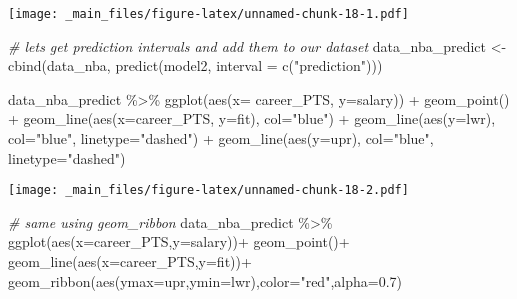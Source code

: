 \documentclass[
]{book}
\newenvironment{Shaded}{\begin{snugshade}}{\end{snugshade}}
\newcommand{\AttributeTok}[1]{\textcolor[rgb]{0.77,0.63,0.00}{#1}}
\newcommand{\AttributeTok}[1]{\textcolor[rgb]{0.13,0.29,0.53}{#1}}
\newcommand{\CommentTok}[1]{\textcolor[rgb]{0.56,0.35,0.01}{\textit{#1}}}
\newcommand{\FloatTok}[1]{\textcolor[rgb]{0.00,0.00,0.81}{#1}}
\newcommand{\FunctionTok}[1]{\textcolor[rgb]{0.00,0.00,0.00}{#1}}
\newcommand{\FunctionTok}[1]{\textcolor[rgb]{0.13,0.29,0.53}{\textbf{#1}}}
\newcommand{\NormalTok}[1]{#1}
\newcommand{\OtherTok}[1]{\textcolor[rgb]{0.56,0.35,0.01}{#1}}
\newcommand{\SpecialCharTok}[1]{\textcolor[rgb]{0.00,0.00,0.00}{#1}}
\newcommand{\SpecialCharTok}[1]{\textcolor[rgb]{0.81,0.36,0.00}{\textbf{#1}}}
\newcommand{\StringTok}[1]{\textcolor[rgb]{0.31,0.60,0.02}{#1}}
\begin{document}
\texttt{[image: \_main\_files/figure-latex/unnamed-chunk-18-1.pdf]}

\begin{Shaded}
\begin{Highlighting}[]
\CommentTok{\# let\textquotesingle{}s get prediction intervals and add them to our dataset}
\NormalTok{data\_nba\_predict }\OtherTok{\textless{}{-}} \FunctionTok{cbind}\NormalTok{(data\_nba, }\FunctionTok{predict}\NormalTok{(model2, }\AttributeTok{interval =} \FunctionTok{c}\NormalTok{(}\StringTok{"prediction"}\NormalTok{)))}

\NormalTok{data\_nba\_predict }\SpecialCharTok{\%\textgreater{}\%}
  \FunctionTok{ggplot}\NormalTok{(}\FunctionTok{aes}\NormalTok{(}\AttributeTok{x=}\NormalTok{ career\_PTS, }\AttributeTok{y=}\NormalTok{salary)) }\SpecialCharTok{+}
  \FunctionTok{geom\_point}\NormalTok{() }\SpecialCharTok{+}
  \FunctionTok{geom\_line}\NormalTok{(}\FunctionTok{aes}\NormalTok{(}\AttributeTok{x=}\NormalTok{career\_PTS, }\AttributeTok{y=}\NormalTok{fit),}
            \AttributeTok{col=}\StringTok{"blue"}\NormalTok{) }\SpecialCharTok{+}
  \FunctionTok{geom\_line}\NormalTok{(}\FunctionTok{aes}\NormalTok{(}\AttributeTok{y=}\NormalTok{lwr),}
                \AttributeTok{col=}\StringTok{"blue"}\NormalTok{,}
                \AttributeTok{linetype=}\StringTok{"dashed"}\NormalTok{) }\SpecialCharTok{+}
  \FunctionTok{geom\_line}\NormalTok{(}\FunctionTok{aes}\NormalTok{(}\AttributeTok{y=}\NormalTok{upr),}
                \AttributeTok{col=}\StringTok{"blue"}\NormalTok{,}
                \AttributeTok{linetype=}\StringTok{"dashed"}\NormalTok{)}
\end{Highlighting}
\end{Shaded}

\texttt{[image: \_main\_files/figure-latex/unnamed-chunk-18-2.pdf]}

\begin{Shaded}
\begin{Highlighting}[]
\CommentTok{\# same using geom\_ribbon}
\NormalTok{data\_nba\_predict }\SpecialCharTok{\%\textgreater{}\%}
\FunctionTok{ggplot}\NormalTok{(}\FunctionTok{aes}\NormalTok{(}\AttributeTok{x=}\NormalTok{career\_PTS,}\AttributeTok{y=}\NormalTok{salary))}\SpecialCharTok{+}
  \FunctionTok{geom\_point}\NormalTok{()}\SpecialCharTok{+}
  \FunctionTok{geom\_line}\NormalTok{(}\FunctionTok{aes}\NormalTok{(}\AttributeTok{x=}\NormalTok{career\_PTS,}\AttributeTok{y=}\NormalTok{fit))}\SpecialCharTok{+}
  \FunctionTok{geom\_ribbon}\NormalTok{(}\FunctionTok{aes}\NormalTok{(}\AttributeTok{ymax=}\NormalTok{upr,}\AttributeTok{ymin=}\NormalTok{lwr),}\AttributeTok{color=}\StringTok{"red"}\NormalTok{,}\AttributeTok{alpha=}\FloatTok{0.7}\NormalTok{)}
\end{Highlighting}
\end{Shaded}
\end{document}
